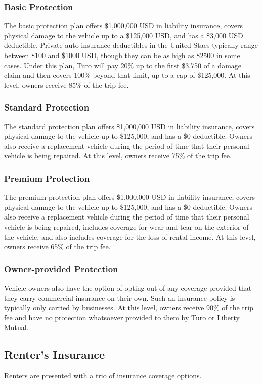 \documentclass[preprint,12pt]{elsarticle}
\begin{document}
\subsubsection{Basic Protection}
The basic protection plan offers \$1,000,000 USD in liability insurance, covers physical damage to the vehicle up to a \$125,000 USD, and has a \$3,000 USD deductible. Private auto insurance deductibles in the United Staes typically range between \$100 and \$1000 USD, though they can be as high as \$2500 in some cases. Under this plan, Turo will pay 20\% up to the first \$3,750 of a damage claim and then covers 100\% beyond that limit, up to a cap of \$125,000. At this level, owners receive 85\% of the trip fee.

\subsubsection{Standard Protection}
The standard protection plan offers \$1,000,000 USD in liability insurance, covers physical damage to the vehicle up to \$125,000, and has a \$0 deductible. Owners also receive a replacement vehicle during the period of time that their personal vehicle is being repaired. At this level, owners receive 75\% of the trip fee.

\subsubsection{Premium Protection}
The premium protection plan offers \$1,000,000 USD in liability insurance, covers physical damage to the vehicle up to \$125,000, and has a \$0 deductible. Owners also receive a replacement vehicle during the period of time that their personal vehicle is being repaired, includes coverage for wear and tear on the exterior of the vehicle, and also includes coverage for the loss of rental income. At this level, owners receive 65\% of the trip fee.

\subsubsection{Owner-provided Protection}
Vehicle owners also have the option of opting-out of any coverage provided that they carry commercial insurance on their own. Such an insurance policy is typically only carried by businesses. At this level, owners receive 90\% of the trip fee and have no protection whatsoever provided to them by Turo or Liberty Mutual.

\subsection{Renter's Insurance}
Renters are presented with a trio of insurance coverage options.
\end{document}
